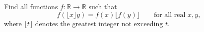 Find all functions $f:\mathbb R\to\mathbb R$ such that
\[f\left(\lfloor x\rfloor y\right)=f(x)\lfloor f(y)\rfloor\qquad\text{for all real }x,y,\]
where $\lfloor t\rfloor$ denotes the greatest integer not exceeding $t$.
